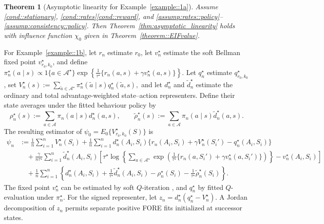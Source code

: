 \documentclass[12pt]{article}
\theoremstyle{plain}
\newtheorem{theorem}{Theorem}
\begin{document}
 
\begin{theorem}[Asymptotic linearity for Example~\ref{example::1a}]
\label{theorem::ALex1}
Assume \ref{cond::stationary}, \ref{cond::rates}\ref{cond::reward}, and
\ref{assump:rates::policy}--\ref{assump:consistency::policy}.  
Then Theorem~\ref{thm:asymptotic_linearity} holds with influence function
$\chi_0$ given in Theorem~\ref{theorem::EIFvalue}.
\end{theorem}





For Example~\ref{example::1b}, let \(r_n\) estimate \(r_0\), let
\(v_n^\star\) estimate the soft Bellman fixed point
\(v_{r_0,k_0}^\star\), and define $\pi_n^\star(a\mid s)
\propto
1\{a\in\mathcal A^\star\}
\exp\!\left\{
\tfrac{1}{\tau^\star}\{r_n(a,s)+\gamma v_n^\star(a,s)\}
\right\}.$ Let \(q_n^\star\) estimate \(q_{r_0,k_0}^\star\), set $V_n^\star(s)
:=
\sum_{\tilde a\in\mathcal A^\star}
\pi_n^\star(\tilde a\mid s)q_n^\star(\tilde a,s),$
and let \(d_n^\star\) and \(\widetilde d_n^\star\) estimate the ordinary and
total advantage-weighted state--action representers. Define their state
averages under the fitted behaviour policy by
\[
\rho_n^\star(s):=\sum_{a\in\mathcal A}\pi_n(a\mid s)d_n^\star(a,s),
\qquad
\widetilde\rho_n^\star(s)
:=\sum_{a\in\mathcal A}\pi_n(a\mid s)\widetilde d_n^\star(a,s).
\]
The resulting estimator of
\(\psi_0=E_0\{V_{r_0,k_0}^\star(S)\}\) is
\begin{align*}
\psi_n
&:=
\frac{1}{n}\sum_{i=1}^n V_n^\star(S_i)
+
\frac{1}{n}\sum_{i=1}^n
d_n^\star(A_i,S_i)
\{r_n(A_i,S_i)+\gamma V_n^\star(S_i')-q_n^\star(A_i,S_i)\}
\\
&\quad+
\frac{\gamma}{n\tau^\star}\sum_{i=1}^n
\widetilde d_n^\star(A_i,S_i)
\left[
\tau^\star
\log\!\left\{
\sum_{a\in\mathcal A^\star}
\exp\!\left(
\tfrac{1}{\tau^\star}\{r_n(a,S_i')+\gamma v_n^\star(a,S_i')\}
\right)
\right\}
-
v_n^\star(A_i,S_i)
\right]
\\
&\quad+
\frac{1}{n}\sum_{i=1}^n
\left\{
 d_n^\star(A_i,S_i)
 +\tfrac{1}{\tau^\star}\widetilde d_n^\star(A_i,S_i)
 -\rho_n^\star(S_i)
 -\tfrac{1}{\tau^\star}\widetilde\rho_n^\star(S_i)
\right\}.
\end{align*}
The fixed point \(v_n^\star\) can be estimated by soft \(Q\)-iteration
\citep{haarnoja2017reinforcement,van2025stationary}, and \(q_n^\star\) by fitted
\(Q\)-evaluation under \(\pi_n^\star\). For the signed representer, let
\(z_n=d_n^\star(q_n^\star-V_n^\star)\). A Jordan decomposition of
\(z_n\) permits separate positive FORE fits initialized at successor states.
\end{document}
